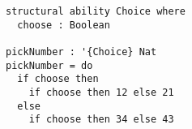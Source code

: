 \begin{algorithm}

\begin{verbatim}
structural ability Choice where
  choose : Boolean
  
pickNumber : '{Choice} Nat
pickNumber = do
  if choose then
    if choose then 12 else 21
  else
    if choose then 34 else 43
\end{verbatim}

\caption{Definition and usage of Choice effect in Unison. %
\label{alg-eff:choice-effect}}
\end{algorithm}